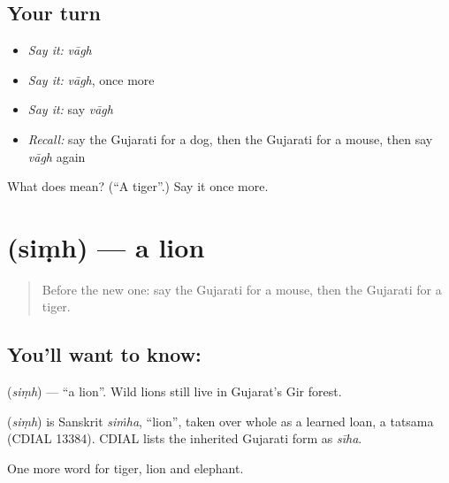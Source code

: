 \subsection*{Your turn}
\begin{itemize}
\raggedright
  \item \emph{Say it:} \emph{vāgh}
  \item \emph{Say it:} \emph{vāgh}, once more
  \item \emph{Say it:} say \emph{vāgh}
  \item \emph{Recall:} say the Gujarati for a dog, then the Gujarati for a mouse, then say \emph{vāgh} again
\end{itemize}

\begin{tcolorbox}[breakable,colback=teal!4,colframe=teal!35!black,title={Before you move on}]
What does  mean? (\textquotedblleft{}A tiger\textquotedblright{}.) Say it once more.
\end{tcolorbox}
\section[\texorpdfstring{\gu{સિંહ} (siṃh)}{સિંહ (siṃh)}]{ (siṃh) — a lion}

\label{lesson:GU-C68-lion}



\begin{quote}
Before the new one: say the Gujarati for a mouse, then the Gujarati for a tiger.
\end{quote}

\subsection*{You'll want to know: }
\textbf{} (\emph{siṃh}) — \textquotedblleft{}a lion\textquotedblright{}. Wild lions still live in Gujarat's Gir forest.

\begin{cousinweb}
\textbf{} (\emph{siṃh}) is Sanskrit \emph{siṁha}, \textquotedblleft{}lion\textquotedblright{}, taken over whole as a learned loan, a tatsama (CDIAL 13384). CDIAL lists the inherited Gujarati form as \emph{sīha}.
\end{cousinweb}

\begin{grammarlens}[title={What you've built}]
One more word for tiger, lion and elephant.
\end{grammarlens}

